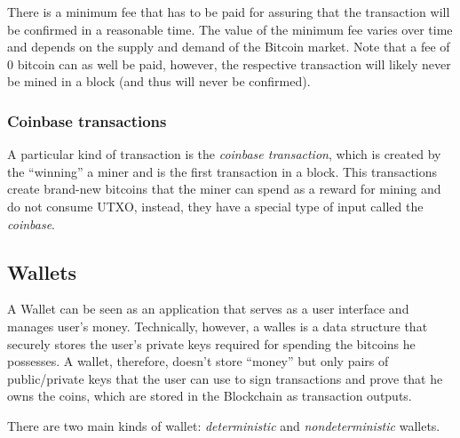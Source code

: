 There is a minimum fee that has to be paid for assuring that the transaction will be confirmed in a reasonable time. The value of the minimum fee varies over time and depends on the supply and demand of the Bitcoin market. Note that a fee of 0 bitcoin can as well be paid, however, the respective transaction will likely never be mined in a block (and thus will never be confirmed). 

\subsubsection{Coinbase transactions} A particular kind of transaction is the
\emph{coinbase transaction}, which is created by the ``winning'' a miner and is
the first transaction in a block. This transactions create brand-new bitcoins
that the miner can spend as a reward for mining and do not consume UTXO,
instead, they have a special type of input called the \emph{coinbase}.








\subsection{Wallets} A Wallet can be seen as an application that serves as a
user interface and manages user's money. Technically, however, a walles is a
data structure that securely stores the user's private keys required for
spending the bitcoins he possesses. A wallet, therefore, doesn't store ``money''
but only pairs of public/private keys that the user can use to sign transactions
and prove that he owns the coins, which are stored in the Blockchain as
transaction outputs.

There are two main kinds of wallet: \emph{deterministic} and
\emph{nondeterministic} wallets.

